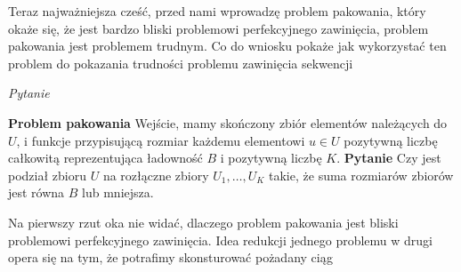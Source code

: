 \documentclass[leqno,10pt]{article}
\def\marg#1{\marginpar{\scriptsize\raggedright#1}}
\begin{document}
Teraz najważniejsza cześć, przed nami wprowadzę problem pakowania, który okaże się, że jest bardzo bliski problemowi perfekcyjnego zawinięcia, problem pakowania jest problemem trudnym. 
Co do wniosku pokaże jak wykorzystać ten problem do pokazania trudności problemu zawinięcia sekwencji

\textit{Pytanie}


\textbf{Problem pakowania}
Wejście, mamy skończony zbiór elementów należących do $U$, i funkcje przypisującą rozmiar każdemu elementowi $u \in U$ pozytywną liczbę całkowitą reprezentująca ładowność $B$ i pozytywną liczbę $K$. 
\newline 
\textbf{Pytanie}
Czy jest podział zbioru $U$ na rozłączne zbiory $U_1, \ldots, U_K$ takie, że suma rozmiarów zbiorów jest równa $B$ lub mniejsza. 

Na pierwszy rzut oka nie widać, dlaczego problem pakowania jest bliski problemowi perfekcyjnego zawinięcia. Idea redukcji jednego problemu w drugi opera się na tym, że potrafimy skonsturować pożadany ciąg  




\marg{ 
}
\end{document}
